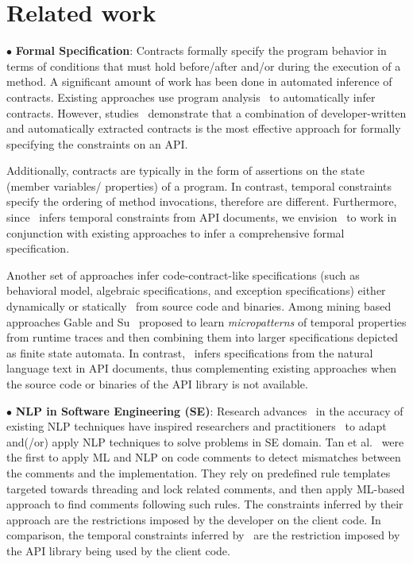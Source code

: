 \section{Related work}
\label{sec:related}

{\small $\bullet$} \textbf{Formal Specification}:
Contracts formally specify the program behavior in terms of conditions that must hold before/after and/or during the execution of a method.
A significant amount of work has been done in automated inference of contracts.
Existing approaches use program analysis~\cite{csallner08dysy,NimmerE02:ISSTA,Tillmann:2006:DLM:2105385.2105433}
to automatically infer contracts.
However, studies~\cite{Polikarpova2009ISSTA,Flanagan2001:HAA} demonstrate that a combination of developer-written and automatically extracted
contracts is the most effective approach for formally specifying the constraints on an API.

Additionally, contracts are typically in the form of assertions on the state (member variables/ properties) of a program. In contrast, temporal constraints specify the ordering of method invocations, therefore are different.
Furthermore, since \tool\ infers temporal constraints from API documents, we envision \tool\ to work in conjunction with existing approaches
to infer a comprehensive formal specification.
 
Another set of approaches infer code-contract-like specifications (such as behavioral model, algebraic specifications, and exception specifications) either dynamically\cite{Henkel07discoveringdocumentation,Ghezzi:2009:SIB:1555001.1555057,Henkel:2008:DDA:1363102.1363105} or statically~\cite{Flanagan2001:HAA,Buse:2008:ADI:1390630.1390664,wasylkowski2011mining} from source code and binaries. 
Among mining based approaches Gable and Su~\cite{gabel2008javert} proposed to learn  
\textit{micropatterns} of temporal properties from runtime traces and then combining them into larger specifications depicted as finite state automata.
In contrast, \tool\ infers specifications from the natural language text in API documents,
thus complementing existing approaches when the source code or binaries of the API library is not available.


{\small $\bullet$} \textbf{NLP in Software Engineering (SE)}:
Research advances~\cite{Marneffe08COLING,KleinNIPS03} in the accuracy of existing NLP techniques have inspired researchers and practitioners~\cite{pandita12:inferring, pandita13:WHYPER, johnSlankasPASSAT13, XiaoFSE2012, thummalapentaICSE12} to adapt and(/or) apply NLP techniques to solve problems in SE domain. 
Tan et al.~\cite{TanSOSP07} were the first to apply ML and NLP on code comments to detect mismatches between the comments and the implementation.
They rely on predefined rule templates targeted towards threading and lock related comments, and then apply ML-based approach to find comments following such rules.
The constraints inferred by their approach are the restrictions imposed by the developer on the client code.
In comparison, the temporal constraints inferred by \tool\ are the restriction imposed by the API library being used by the client code.

